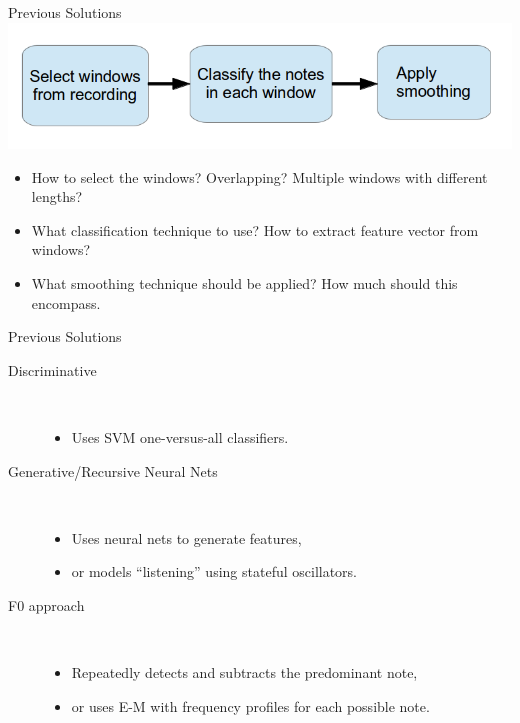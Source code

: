 \documentclass{beamer}
\begin{document}
\begin{frame}{Previous Solutions}
\includegraphics[scale=.4]{algorithm_template.png}

\begin{itemize}
\item How to select the windows? Overlapping? Multiple windows with different lengths?
\item What classification technique to use? How to extract feature vector from windows?
\item What smoothing technique should be applied? How much should this encompass.
\end{itemize}
\end{frame}

\begin{frame}{Previous Solutions}
\begin{description} 
\item[Discriminative] \hfill \\ 
    \begin{itemize}\setlength{\itemindent}{-5em}
    \item  Uses SVM one-versus-all classifiers.
    \end{itemize}
\item[Generative/Recursive Neural Nets] \hfill \\
    \begin{itemize}\setlength{\itemindent}{-5em}
    \item Uses neural nets to generate features,
    \item or models ``listening'' using stateful oscillators.
    \end{itemize}
\item[F0 approach] \hfill \\
    \begin{itemize}\setlength{\itemindent}{-5em}
    \item Repeatedly detects and subtracts the predominant note,
    \item or uses E-M with frequency profiles for each possible note.
    \end{itemize}
\end{description}
\end{frame}
\end{document}
